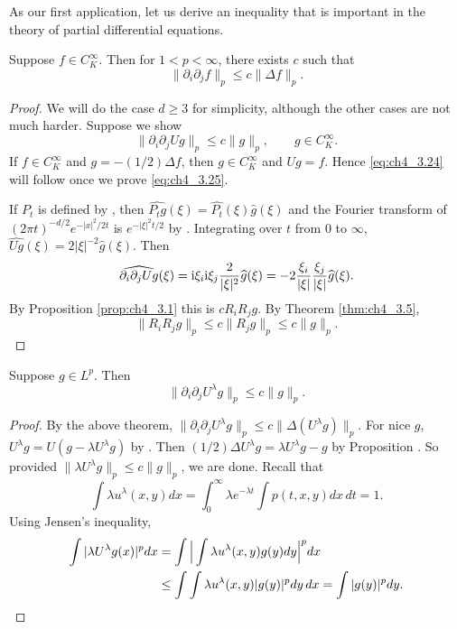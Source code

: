 
As our first application, let us derive an inequality that is important in the theory of partial differential equations.

\begin{theorem}\label{thm:ch4_3.8}
Suppose $f \in C_K^\infty$. Then for $1 < p < \infty$, there exists $c$ such that
\begin{equation}\label{eq:ch4_3.24}
    \|\partial_i\partial_j f\|_p \leq c\|\Delta f\|_p.
\end{equation}
\end{theorem}

\begin{proof}
We will do the case $d \geq 3$ for simplicity, although the other cases are not much harder. Suppose we show
\begin{equation}\label{eq:ch4_3.25}
    \|\partial_i\partial_j Ug\|_p \leq c\|g\|_p, \qquad g \in C_K^\infty.
\end{equation}
If $f \in C_K^\infty$ and $g = -(1/2)\Delta f$, then $g \in C_K^\infty$ and $Ug = f$. Hence \eqref{eq:ch4_3.24} will follow once we prove \eqref{eq:ch4_3.25}.

If $P_t$ is defined by , then $\widehat{P_t g}(\xi) = \widehat{P_t}(\xi)\widehat{g}(\xi)$ and the Fourier transform of $(2\pi t)^{-d/2}e^{-|x|^2/2t}$ is $e^{-|\xi|^2t/2}$ by . Integrating over $t$ from $0$ to $\infty$, $\widehat{Ug}(\xi) = 2|\xi|^{-2}\widehat{g}(\xi)$. Then
\[
    \widehat{\partial_i\partial_j Ug}(\xi) = \mathrm{i}\xi_i\mathrm{i}\xi_j \frac{2}{|\xi|^2}\widehat{g}(\xi) = -2\frac{\xi_i}{|\xi|}\frac{\xi_j}{|\xi|}\widehat{g}(\xi).
\]
By Proposition \ref{prop:ch4_3.1} this is $cR_iR_j g$. By Theorem \ref{thm:ch4_3.5},
\[
    \|R_iR_j g\|_p \leq c\|R_j g\|_p \leq c\|g\|_p.
\]
\end{proof}

\begin{corollary}\label{cor:ch4_3.9}
Suppose $g \in L^p$. Then
\[
    \|\partial_i\partial_j U^\lambda g\|_p \leq c\|g\|_p.
\]
\end{corollary}

\begin{proof}
By the above theorem, $\|\partial_i\partial_j U^\lambda g\|_p \leq c\|\Delta(U^\lambda g)\|_p$. For nice $g$, $U^\lambda g = U(g-\lambda U^\lambda g)$ by . Then $(1/2)\Delta U^\lambda g = \lambda U^\lambda g-g$ by Proposition . So provided $\|\lambda U^\lambda g\|_p \leq c\|g\|_p$, we are done. Recall that
\[
    \int \lambda u^\lambda(x,y)dx = \int_0^\infty \lambda e^{-\lambda t} \int p(t,x,y)dx\,dt = 1.
\]
Using Jensen's inequality,
\begin{align}\label{eq:ch4_3.26}
    \int |\lambda U^\lambda g(x)|^p dx &= \int \Big|\int \lambda u^\lambda(x,y)g(y)dy\Big|^p dx \\
    &\leq \int\int \lambda u^\lambda(x,y)|g(y)|^p dy\,dx = \int |g(y)|^p dy. \notag
\end{align}
\end{proof}

